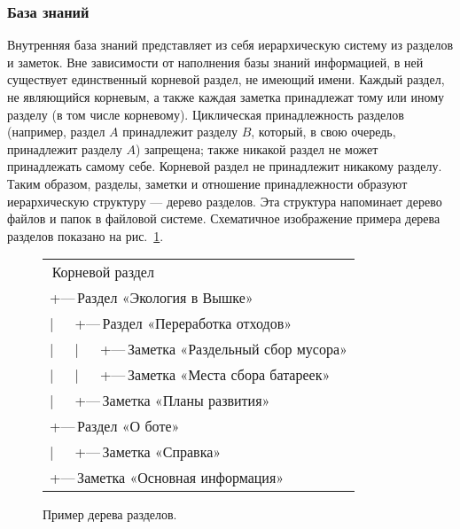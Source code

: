 \documentclass[12pt]{article}
\begin{document}
        \subsubsection{База знаний}
            \label{sec:req:fn:kb}
            Внутренняя база знаний представляет из себя иерархическую систему из разделов
            и заметок. Вне зависимости от наполнения базы знаний информацией, в ней существует единственный
            корневой раздел, не имеющий имени. Каждый раздел, не являющийся корневым, а также
            каждая заметка принадлежат тому или иному разделу (в том числе корневому). Циклическая
            принадлежность разделов (например, раздел \(A\) принадлежит разделу \(B\), который, в свою
            очередь, принадлежит разделу \(A\)) запрещена; также никакой раздел не может принадлежать самому
            себе. Корневой раздел не принадлежит никакому разделу. Таким образом, разделы, заметки и отношение
            принадлежности образуют иерархическую структуру --- дерево разделов. Эта структура напоминает
            дерево файлов и папок в файловой системе. Схематичное изображение примера дерева разделов
            показано на рис.~\ref{fig:req:fn:kb:tree}.
            \begin{figure}[h]
                \centering
                \begingroup
                \newcommand{\name}{\rmfamily\,}
                \begin{tabular}{>{\ttfamily}l}
                    \name Корневой раздел \\
                    +---\name Раздел «Экология в Вышке» \\
                    |~~~+---\name Раздел «Переработка отходов» \\
                    |~~~|~~~+---\name Заметка «Раздельный сбор мусора» \\
                    |~~~|~~~+---\name Заметка «Места сбора батареек» \\
                    |~~~+---\name Заметка «Планы развития» \\
                    +---\name Раздел «О боте» \\
                    |~~~+---\name Заметка «Справка» \\
                    +---\name Заметка «Основная информация» \\
                \end{tabular}
                \endgroup
                \caption{Пример дерева разделов.}
                \label{fig:req:fn:kb:tree}
            \end{figure}
\end{document}
